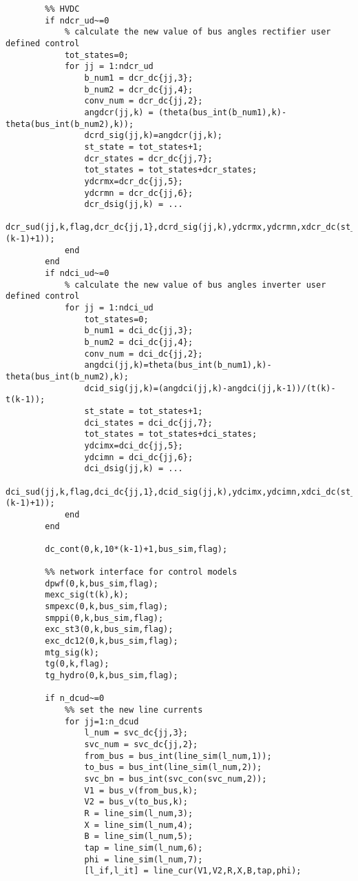 \documentclass[12pt]{article}
\begin{document}
\begin{verbatim}
        %% HVDC
        if ndcr_ud~=0
            % calculate the new value of bus angles rectifier user defined control
            tot_states=0;
            for jj = 1:ndcr_ud
                b_num1 = dcr_dc{jj,3};
                b_num2 = dcr_dc{jj,4};
                conv_num = dcr_dc{jj,2};
                angdcr(jj,k) = (theta(bus_int(b_num1),k)-theta(bus_int(b_num2),k));
                dcrd_sig(jj,k)=angdcr(jj,k);
                st_state = tot_states+1; 
                dcr_states = dcr_dc{jj,7}; 
                tot_states = tot_states+dcr_states;
                ydcrmx=dcr_dc{jj,5};
                ydcrmn = dcr_dc{jj,6};
                dcr_dsig(jj,k) = ...
                    dcr_sud(jj,k,flag,dcr_dc{jj,1},dcrd_sig(jj,k),ydcrmx,ydcrmn,xdcr_dc(st_state:tot_states,10*(k-1)+1));
            end
        end
        if ndci_ud~=0
            % calculate the new value of bus angles inverter user defined control
            for jj = 1:ndci_ud
                tot_states=0;
                b_num1 = dci_dc{jj,3};
                b_num2 = dci_dc{jj,4};
                conv_num = dci_dc{jj,2};
                angdci(jj,k)=theta(bus_int(b_num1),k)-theta(bus_int(b_num2),k);
                dcid_sig(jj,k)=(angdci(jj,k)-angdci(jj,k-1))/(t(k)-t(k-1));
                st_state = tot_states+1; 
                dci_states = dci_dc{jj,7}; 
                tot_states = tot_states+dci_states;
                ydcimx=dci_dc{jj,5};
                ydcimn = dci_dc{jj,6};
                dci_dsig(jj,k) = ...
                    dci_sud(jj,k,flag,dci_dc{jj,1},dcid_sig(jj,k),ydcimx,ydcimn,xdci_dc(st_state:tot_states,10*(k-1)+1));
            end
        end
        
        dc_cont(0,k,10*(k-1)+1,bus_sim,flag);
        
        %% network interface for control models
        dpwf(0,k,bus_sim,flag);
        mexc_sig(t(k),k);
        smpexc(0,k,bus_sim,flag);
        smppi(0,k,bus_sim,flag);
        exc_st3(0,k,bus_sim,flag);
        exc_dc12(0,k,bus_sim,flag);
        mtg_sig(k);
        tg(0,k,flag);
        tg_hydro(0,k,bus_sim,flag);
        
        if n_dcud~=0
            %% set the new line currents
            for jj=1:n_dcud
                l_num = svc_dc{jj,3};
                svc_num = svc_dc{jj,2};
                from_bus = bus_int(line_sim(l_num,1)); 
                to_bus = bus_int(line_sim(l_num,2));
                svc_bn = bus_int(svc_con(svc_num,2));
                V1 = bus_v(from_bus,k);
                V2 = bus_v(to_bus,k);
                R = line_sim(l_num,3);
                X = line_sim(l_num,4);
                B = line_sim(l_num,5);
                tap = line_sim(l_num,6);
                phi = line_sim(l_num,7);
                [l_if,l_it] = line_cur(V1,V2,R,X,B,tap,phi);
                

\end{verbatim}
\end{document}
